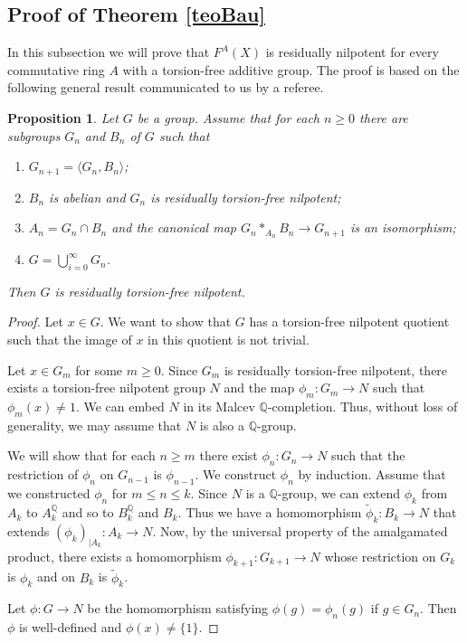 \documentclass[11pt]{amsart}
\newtheorem{pro}[lem]{Proposition}
\numberwithin{claimcounter}{lem}
\newcommand{\Q}{\mathbb{Q}}
\begin{document}
 \subsection{Proof of Theorem \ref{teoBau}}
  In this subsection we will prove that $F^{A}(X)$ is residually nilpotent for every commutative ring  $A$ with a torsion-free additive group.    The proof is based on the following general result communicated to us by a referee.
 \begin{pro}\label{referee}
 Let    $G$ be a group. Assume that for each $n\ge 0$ there are subgroups $G_n$  and $B_n$ of $G$ such that 
 
 \begin{enumerate}
 \item[(a)] $G_{n+1}=\langle G_n, B_n\rangle$;
 \item[(b)] $B_n$ is abelian and $G_n$ is residually torsion-free nilpotent;
 \item[(c)] $A_n=G_n\cap B_n$  and the canonical map $G_n*_{A_n} B_n\to G_{n+1}$ is an isomorphism;
 \item[(d)]  $G=\bigcup_{i=0}^\infty G_n$.
 \end{enumerate}
Then $G$ is residually torsion-free nilpotent.
 \end{pro}
 \begin{proof} Let $x\in G$. We want to show that $G$ has  a torsion-free nilpotent quotient such that the image of $x$ in this quotient is not trivial. 
 
 Let $x\in G_m$ for some $m\ge 0$. Since $G_m$  is residually torsion-free nilpotent, there exists a torsion-free nilpotent group $N$ and the map $\phi_m:G_m\to N$ such that $\phi_m(x)\ne 1$.  We can embed $N$ in its Malcev $\Q$-completion.  
 Thus, without loss of generality, we may assume that $N$ is also a $\Q$-group.
 
We will show that for each $n\ge m$ there exist $\phi_n:G_n\to N$ such that the restriction of $\phi_n$ on $G_{n-1}$ is $\phi_{n-1}$. We construct $\phi_n$ by induction. Assume that we constructed $\phi_n$ for $m\le n\le k$. Since $N$ is a $\Q$-group, we can extend $\phi_{k}$ from $A_k$ to $A_k^\Q$ and so to $B_k^\Q$ and $B_k$. Thus we have a homomorphism $\tilde \phi_k: B_k\to N$ that extends    $(\phi_k)_{|A_k}:A_k\to N$. Now, by the universal property of  the amalgamated product, there exists a homomorphism $\phi_{k+1}:G_{k+1}\to N$ whose restriction on $G_k$ is $\phi_k$ and on $B_k$ is $\tilde \phi_k$.

Let   $\phi:G\to N$ be the homomorphism satisfying  $\phi(g)=\phi_n(g)$ if $g\in G_n$. Then $\phi$ is well-defined and $\phi(x)\ne \{1\}$.
 \end{proof}
 
\end{document}
